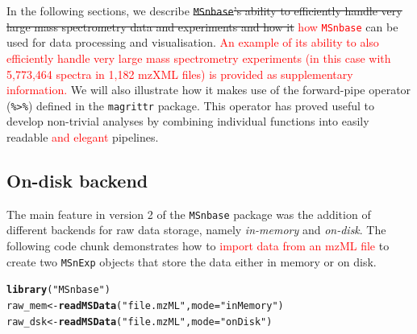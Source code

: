 \documentclass[journal=jacsat,manuscript=article]{achemso}\usepackage[]{graphicx}\usepackage[]{color}
\makeatletter
\newcommand{\hlstr}[1]{\textcolor[rgb]{0.192,0.494,0.8}{#1}}%
\newcommand{\hlstd}[1]{\textcolor[rgb]{0.345,0.345,0.345}{#1}}%
\newcommand{\hlkwb}[1]{\textcolor[rgb]{0.69,0.353,0.396}{#1}}%
\newcommand{\hlkwc}[1]{\textcolor[rgb]{0.333,0.667,0.333}{#1}}%
\newcommand{\hlkwd}[1]{\textcolor[rgb]{0.737,0.353,0.396}{\textbf{#1}}}%
\newenvironment{kframe}{%
 \def\at@end@of@kframe{}%
 \ifinner\ifhmode%
  \def\at@end@of@kframe{\end{minipage}}%
  \begin{minipage}{\columnwidth}%
 \fi\fi%
 \def\FrameCommand##1{\hskip\@totalleftmargin \hskip-\fboxsep
 \colorbox{shadecolor}{##1}\hskip-\fboxsep
     \hskip-\linewidth \hskip-\@totalleftmargin \hskip\columnwidth}%
 \MakeFramed {\advance\hsize-\width
   \@totalleftmargin\z@ \linewidth\hsize
   \@setminipage}}%
 {\par\unskip\endMakeFramed%
 \at@end@of@kframe}
\newenvironment{knitrout}{}{} %
\makeatother
\begin{document}
In the following sections, we describe \sout{\texttt{MSnbase}'s
  ability to efficiently handle very large mass spectrometry data and
  experiments and how it} \textcolor{red}{how \texttt{MSnbase}} can be
used for data processing and visualisation. \textcolor{red}{An example
  of its ability to also efficiently handle very large mass
  spectrometry experiments (in this case with 5,773,464 spectra in
  1,182 mzXML files) is provided as supplementary information.}  We
will also illustrate how it makes use of the forward-pipe operator
(\texttt{\%>\%}) defined in the \texttt{magrittr} package. This
operator has proved useful to develop non-trivial analyses by
combining individual functions into easily readable
\textcolor{red}{and elegant} pipelines.


\subsection{On-disk backend}

The main feature in version 2 of the \texttt{MSnbase} package was the
addition of different backends for raw data storage, namely
\textit{in-memory} and \textit{on-disk}. The following code chunk
demonstrates how to \textcolor{red}{import data from an mzML file} to
create two \texttt{MSnExp} objects that store the data either
in memory or on disk.

\begin{knitrout}
\color{fgcolor}\begin{kframe}
\begin{alltt}
\hlkwd{library}\hlstd{(}\hlstr{"MSnbase"}\hlstd{)}
\hlstd{raw_mem} \hlkwb{<-} \hlkwd{readMSData}\hlstd{(}\hlstr{"file.mzML"}\hlstd{,} \hlkwc{mode} \hlstd{=} \hlstr{"inMemory"}\hlstd{)}
\hlstd{raw_dsk} \hlkwb{<-} \hlkwd{readMSData}\hlstd{(}\hlstr{"file.mzML"}\hlstd{,} \hlkwc{mode} \hlstd{=} \hlstr{"onDisk"}\hlstd{)}
\end{alltt}
\end{kframe}
\end{knitrout}
\end{document}
